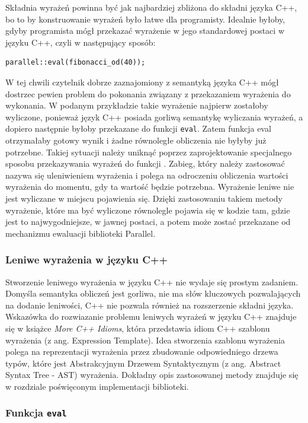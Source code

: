   Składnia wyrażeń powinna być jak najbardziej zbliżona do składni języka C++, bo to by konstruowanie wyrażeń było łatwe dla programisty.
  Idealnie byłoby, gdyby programista mógł przekazać wyrażenie w jego standardowej postaci w języku C++, czyli w następujący sposób:
  \begin{lstlisting}[numbers=none, frame=none]
    parallel::eval(fibonacci_od(40));
  \end{lstlisting}
  W tej chwili czytelnik dobrze zaznajomiony z semantyką języka C++ mógł dostrzec pewien problem do pokonania związany z przekazaniem wyrażenia do wykonania.
  W podanym przykładzie takie wyrażenie najpierw zostałoby wyliczone, ponieważ język C++ posiada gorliwą semantykę wyliczania wyrażeń, a dopiero następnie byłoby przekazane do funkcji \verb|eval|.
  Zatem funkcja eval otrzymałaby gotowy wynik i żadne równoległe obliczenia nie byłyby już potrzebne.
  Takiej sytuacji należy uniknąć poprzez zaprojektowanie specjalnego sposobu przekazywania wyrażeń do funkcji \feval.
  Zabieg, który należy zastosować nazywa się uleniwieniem wyrażenia i polega na odroczeniu obliczenia wartości wyrażenia do momentu, gdy ta wartość będzie potrzebna.
  Wyrażenie leniwe nie jest wyliczane w miejscu pojawienia się.
  Dzięki zastosowaniu takiem metody wyrażenie, które ma być wyliczone równolegle pojawia się w kodzie tam, gdzie jest to najwygodniejsze, w jawnej postaci, a potem może zostać przekazane od mechanizmu ewaluacji biblioteki Parallel.
  
\subsubsection{Leniwe wyrażenia w języku C++}

  Stworzenie leniwego wyrażenia w języku C++ nie wydaje się prostym zadaniem.
  Domyśla semantyka obliczeń jest gorliwa, nie ma słów kluczowych pozwalających na dodanie leniwości, C++ nie pozwala również na rozszerzenie składni języka.
  Wskazówka do rozwiazanie problemu leniwych wyrażeń w języku C++ znajduje się w książce \textit{More C++ Idioms}\cite{idioms}, która przedstawia idiom C++ szablonu wyrażenia (z ang. Expression Template).
  Idea stworzenia szablonu wyrażenia polega na reprezentacji wyrażenia przez zbudowanie odpowiedniego drzewa typów, które jest Abstrakcyjnym Drzewem Syntaktycznym (z ang. Abstract Syntax Tree - AST) wyrażenia.
  Dokładny opis zastosowanej metody znajduje się w rozdziale poświęconym implementacji biblioteki.
  
  \subsubsection{Funkcja \texttt{eval}}\label{sss:eval}

